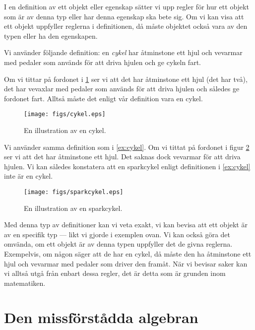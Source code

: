 I en definition av ett objekt eller egenskap sätter vi upp regler för hur ett 
objekt som är av denna typ eller har denna egenskap ska bete sig.
Om vi kan visa att ett objekt uppfyller reglerna i definitionen, då måste
objektet också vara av den typen eller ha den egenskapen.

\begin{example}\label{ex:cykel}
  Vi använder följande definition: en \emph{cykel} har åtminstone ett hjul och 
  vevarmar med pedaler som används för att driva hjulen och ge cykeln fart.

  Om vi tittar på fordonet i \cref{fig:cykel} ser vi att det har 
  åtminstone ett hjul (det har två), det har vevaxlar med pedaler som används 
  för att driva hjulen och således ge fordonet fart.
  Alltså måste det enligt vår definition vara en cykel.
\end{example}
\begin{figure}
  \texttt{[image: figs/cykel.eps]}
  \caption{En illustration av en cykel.}\label{fig:cykel}
\end{figure}

\begin{example}\label{ex:bil}
  Vi använder samma definition som i \cref{ex:cykel}.
  Om vi tittat på fordonet i figur \cref{fig:sparkcykel} ser vi att det 
  har åtminstone ett hjul.
  Det saknas dock vevarmar för att driva hjulen.
  Vi kan således konstatera att en sparkcykel enligt definitionen i 
  \cref{ex:cykel} inte är en cykel.
\end{example}
\begin{figure}
  \texttt{[image: figs/sparkcykel.eps]}
  \caption{En illustration av en sparkcykel.}\label{fig:sparkcykel}
\end{figure}

Med denna typ av definitioner kan vi veta exakt, vi kan bevisa att ett objekt 
är av en specifik typ --- likt vi gjorde i exemplen ovan.
Vi kan också göra det omvända, om ett objekt är av denna typen uppfyller det de
givna reglerna.
Exempelvis, om någon säger att de har en cykel, då måste den ha åtminstone ett 
hjul och vevarmar med pedaler som driver den framåt.
När vi bevisar saker kan vi alltså utgå från enbart dessa regler, det är detta 
som är grunden inom matematiken.


\section{Den missförstådda algebran}

